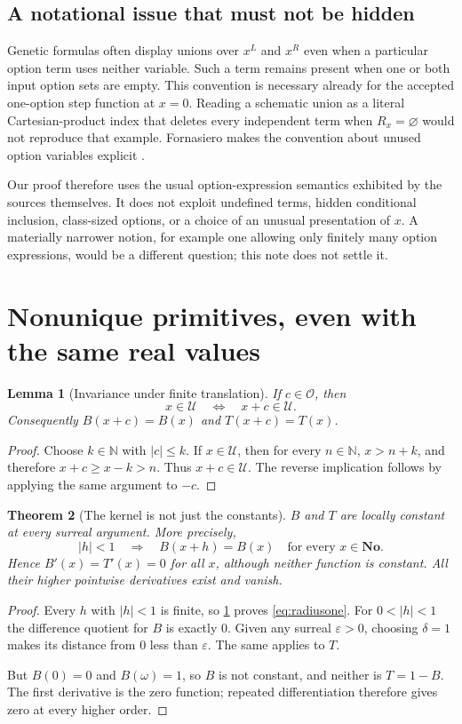 \documentclass[11pt,letterpaper]{article}
\numberwithin{equation}{section}
\newtheorem{theorem}{Theorem}[section]
\newtheorem{lemma}[theorem]{Lemma}
\theoremstyle{definition}
\theoremstyle{remark}
\newcommand{\No}{\mathbf{No}}
\newcommand{\N}{\mathbb{N}}
\newcommand{\Fin}{\mathcal{O}}
\newcommand{\U}{\mathcal{U}}
\newcommand{\source}[2]{\cite[#1]{#2}}
\begin{document}
\subsection{A notational issue that must not be hidden}
Genetic formulas often display unions over $x^L$ and $x^R$ even when a
particular option term uses neither variable. Such a term remains present
when one or both input option sets are empty. This convention is necessary
already for the accepted one-option step function at $x=0$. Reading a
schematic union as a literal Cartesian-product index that deletes every
independent term when $R_x=\varnothing$ would not reproduce that example.
Fornasiero makes the convention about unused option variables explicit
\source{Example~2.5}{Fornasiero}.

Our proof therefore uses the usual option-expression semantics exhibited
by the sources themselves. It does not exploit undefined terms, hidden
conditional inclusion, class-sized options, or a choice of an unusual
presentation of $x$. A materially narrower notion, for example one
allowing only finitely many option expressions, would be a different
question; this note does not settle it.

\section{Nonunique primitives, even with the same real values}\label{sec:primitive}
\begin{lemma}[Invariance under finite translation]\label{lem:translation}
If $c\in\Fin$, then
\[
 x\in\U\quad\Longleftrightarrow\quad x+c\in\U.
\]
Consequently $B(x+c)=B(x)$ and $T(x+c)=T(x)$.
\end{lemma}
\begin{proof}
Choose $k\in\N$ with $|c|\le k$. If $x\in\U$, then for every $n\in\N$,
$x>n+k$, and therefore $x+c\ge x-k>n$. Thus $x+c\in\U$.
The reverse implication follows by applying the same argument to $-c$.
\end{proof}

\begin{theorem}[The kernel is not just the constants]\label{thm:zero}
$B$ and $T$ are locally constant at every surreal argument. More precisely,
\begin{equation}\label{eq:radiusone}
 |h|<1\quad\Longrightarrow\quad B(x+h)=B(x)
 \quad\text{for every }x\in\No.
\end{equation}
Hence $B'(x)=T'(x)=0$ for all $x$, although neither function is constant.
All their higher pointwise derivatives exist and vanish.
\end{theorem}
\begin{proof}
Every $h$ with $|h|<1$ is finite, so \cref{lem:translation} proves
\eqref{eq:radiusone}. For $0<|h|<1$ the difference quotient for $B$ is
exactly $0$. Given any surreal $\varepsilon>0$, choosing $\delta=1$ makes
its distance from $0$ less than $\varepsilon$. The same applies to $T$.

But $B(0)=0$ and $B(\omega)=1$, so $B$ is not constant, and neither is
$T=1-B$. The first derivative is the zero function; repeated differentiation
therefore gives zero at every higher order.
\end{proof}
\end{document}
